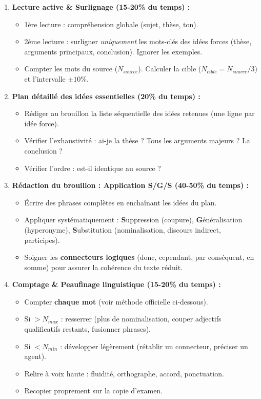 \documentclass[11pt]{article}
\begin{document}
\begin{methode}
\begin{enumerate}
    \item \textbf{Lecture active \& Surlignage (15-20\% du temps) :} 
    \begin{itemize}
        \item 1ère lecture : compréhension globale (sujet, thèse, ton).
        \item 2ème lecture : surligner \emph{uniquement} les mots-clés des idées forces (thèse, arguments principaux, conclusion). Ignorer les exemples.
        \item Compter les mots du source ($N_{source}$). Calculer la cible ($N_{cible} = N_{source} / 3$) et l'intervalle $\pm 10\%$.
    \end{itemize}
    \item \textbf{Plan détaillé des idées essentielles (20\% du temps) :} 
    \begin{itemize}
        \item Rédiger au brouillon la liste séquentielle des idées retenues (une ligne par idée force).
        \item Vérifier l'exhaustivité : ai-je la thèse ? Tous les arguments majeurs ? La conclusion ?
        \item Vérifier l'ordre : est-il identique au source ?
    \end{itemize}
    \item \textbf{Rédaction du brouillon : Application S/G/S (40-50\% du temps) :} 
    \begin{itemize}
        \item Écrire des phrases complètes en enchaînant les idées du plan.
        \item Appliquer systématiquement : \textbf{S}uppression (coupure), \textbf{G}énéralisation (hyperonyme), \textbf{S}ubstitution (nominalisation, discours indirect, participes).
        \item Soigner les \textbf{connecteurs logiques} (donc, cependant, par conséquent, en somme) pour assurer la cohérence du texte réduit.
    \end{itemize}
    \item \textbf{Comptage \& Peaufinage linguistique (15-20\% du temps) :} 
    \begin{itemize}
        \item Compter \textbf{chaque mot} (voir méthode officielle ci-dessous).
        \item Si $> N_{max}$ : resserrer (plus de nominalisation, couper adjectifs qualificatifs restants, fusionner phrases).
        \item Si $< N_{min}$ : développer légèrement (rétablir un connecteur, préciser un agent).
        \item Relire à voix haute : fluidité, orthographe, accord, ponctuation.
        \item Recopier proprement sur la copie d'examen.
    \end{itemize}
\end{enumerate}
\end{methode}
\end{document}
